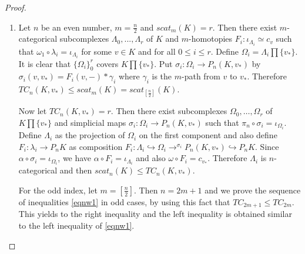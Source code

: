 \documentclass[10pt,a4paper]{amsart}
\begin{document}
\begin{proof}
\begin{enumerate}
\item
Let $n$ be an even number, $m = \frac{n}{2}$ and  $scat_{m} (K) = r$. Then there exist $m$-categorical subcomplexes $\Lambda _0,...,\Lambda _r$ of $K$ and $m$-homotopies $F_i :\iota_{\Lambda_i} \simeq c_{v}$ such that $\omega_1 \circ \lambda _i=\iota_{\Lambda _i}$ for some $v \in K$ and for all $0\leq i\leq r$. 
Define $\Omega _i =\Lambda _i \prod \lbrace v_* \rbrace $. It is clear that $\lbrace \Omega _i \rbrace _0 ^r$ covers $K\prod \lbrace  v_*\rbrace$. Put $\sigma _i:\Omega _i\to P_{n}(K,v_*)$ by $\sigma _i (v,v_*)=F_i(v, -) * \gamma_i$ where $\gamma_i$ is the $m$-path from $v$ to $v_*$. Therefore $TC_{n}(K, v_*) \le scat_m(K) = scat_{[\frac{n}{2}]} (K)$.


Now let $TC_{n} (K, v_*) = r$. Then there exist subcomplexes $\Omega_0, \ldots, \Omega_r$ of $K \prod \{v_*\}$ and simplicial maps $\sigma_i: \Omega_i \to P_{n} (K,v_*)$ such that $\pi_{n} \circ \sigma_i = \iota_{\Omega_i}$. Define $\Lambda_i$ as the projection of $\Omega_i$ on the first component and  also define $F_i: \lambda_i \to P_{n} K$ as composition $F_i: \Lambda_i \hookrightarrow \Omega_i \to^{\sigma_i} P_{n}(K, v_*) \hookrightarrow P_{n} K$.  Since $\alpha \circ \sigma_i = \iota_{\Omega_i}$, we have $\alpha \circ F_i = \iota_{\Lambda_i}$ and also $\omega \circ F_i = c_{v_*}$. Therefore $\Lambda_i$ is $n$-categorical and then $scat_{n} (K) \le TC_{n} (K, v_*)$. 

For the odd index, let $m = [\frac{n}{2}]$. Then $n = 2m +1$ and we prove the sequence of inequalities \eqref{eqnw1} in odd cases, 
by using this fact that $TC_{2m +1} \le TC_{2m}$. This yields to the right inequality and the left inequality is obtained similar to the left inequality of 
\eqref{eqnw1}.
%
%
%


\end{enumerate}
\end{proof}
\end{document}
